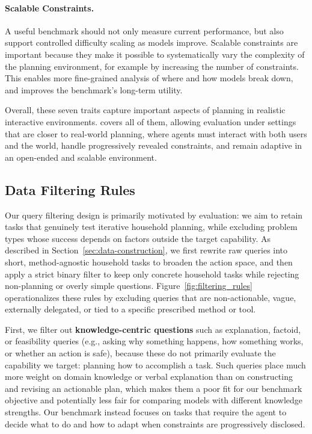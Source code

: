 \paragraph{Scalable Constraints.}
A useful benchmark should not only measure current performance, but also support controlled difficulty scaling as models improve. 
Scalable constraints are important because they make it possible to systematically vary the complexity of the planning environment, for example by increasing the number of constraints.
This enables more fine-grained analysis of where and how models break down, and improves the benchmark's long-term utility.

Overall, these seven traits capture important aspects of planning in realistic interactive environments. \bench{} covers all of them, allowing evaluation under settings that are closer to real-world planning, where agents must interact with both users and the world, handle progressively revealed constraints, and remain adaptive in an open-ended and scalable environment.

\subsection{Data Filtering Rules}
\label{app:data_filtering_rule_exp}

Our query filtering design is primarily motivated by evaluation: we aim to retain tasks that genuinely test iterative household planning, while excluding problem types whose success depends on factors outside the target capability. 
As described in Section~\ref{sec:data-construction}, we first rewrite raw queries into short, method-agnostic household tasks to broaden the action space, and then apply a strict binary filter to keep only concrete household tasks while rejecting non-planning or overly simple questions. 
Figure~\ref{fig:filtering_rules} operationalizes these rules by excluding queries that are non-actionable, vague, externally delegated, or tied to a specific prescribed method or tool.

First, we filter out \textbf{knowledge-centric questions} such as explanation, factoid, or feasibility queries (e.g., asking why something happens, how something works, or whether an action is safe), because these do not primarily evaluate the capability we target: planning how to accomplish a task. 
Such queries place much more weight on domain knowledge or verbal explanation than on constructing and revising an actionable plan, which makes them a poor fit for our benchmark objective and potentially less fair for comparing models with different knowledge strengths. 
Our benchmark instead focuses on tasks that require the agent to decide what to do and how to adapt when constraints are progressively disclosed.


